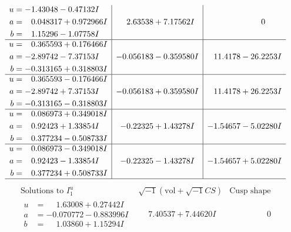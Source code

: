 \documentclass[1p]{elsarticle_modified}
\theoremstyle{definition}
\newcommand{\I}{\sqrt{-1}}
\begin{document}
$$\begin{array}{c|c|c}
\begin{aligned}
u &= -1.43048 - 0.47132 I \\
a &= \phantom{-}0.048317 + 0.972966 I \\
b &= \phantom{-}1.15296 - 1.07758 I\end{aligned}
 & \phantom{-}2.63538 + 7.17562 I & \phantom{-0.000000 } 0 \\ \hline\begin{aligned}
u &= \phantom{-}0.365593 + 0.176466 I \\
a &= -2.89742 - 7.37153 I \\
b &= -0.313165 + 0.318803 I\end{aligned}
 & -0.056183 - 0.359580 I & \phantom{-}11.4178 - 26.2253 I \\ \hline\begin{aligned}
u &= \phantom{-}0.365593 - 0.176466 I \\
a &= -2.89742 + 7.37153 I \\
b &= -0.313165 - 0.318803 I\end{aligned}
 & -0.056183 + 0.359580 I & \phantom{-}11.4178 + 26.2253 I \\ \hline\begin{aligned}
u &= \phantom{-}0.086973 + 0.349018 I \\
a &= \phantom{-}0.92423 + 1.33854 I \\
b &= \phantom{-}0.377234 - 0.508733 I\end{aligned}
 & -0.22325 + 1.43278 I & -1.54657 - 5.02280 I \\ \hline\begin{aligned}
u &= \phantom{-}0.086973 - 0.349018 I \\
a &= \phantom{-}0.92423 - 1.33854 I \\
b &= \phantom{-}0.377234 + 0.508733 I\end{aligned}
 & -0.22325 - 1.43278 I & -1.54657 + 5.02280 I\\
 \hline 
 \end{array}$$\newpage$$\begin{array}{c|c|c}  
\text{Solutions to }I^u_{1}& \I (\text{vol} + \sqrt{-1}CS) & \text{Cusp shape}\\
 \hline 
\begin{aligned}
u &= \phantom{-}1.63008 + 0.27442 I \\
a &= -0.070772 - 0.883996 I \\
b &= \phantom{-}1.03860 + 1.15294 I\end{aligned}
 & \phantom{-}7.40537 + 7.44620 I & \phantom{-0.000000 } 0 \\ \hline\begin{aligned}

\end{aligned}
\end{array}$$
\end{document}
